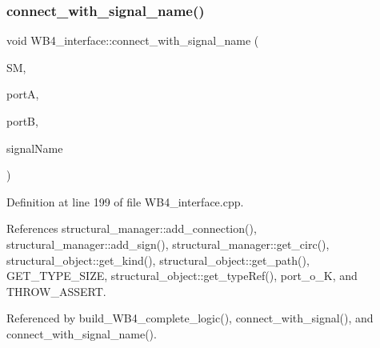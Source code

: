 \subsubsection{\texorpdfstring{connect\+\_\+with\+\_\+signal\+\_\+name()}{connect\_with\_signal\_name()}\hspace{0.1cm}{\footnotesize\ttfamily [1/3]}}
{\footnotesize\ttfamily void W\+B4\+\_\+interface\+::connect\+\_\+with\+\_\+signal\+\_\+name (\begin{DoxyParamCaption}\item[{\hyperlink{structural__manager_8hpp_ab3136f0e785d8535f8d252a7b53db5b5}{structural\+\_\+manager\+Ref}}]{SM,  }\item[{\hyperlink{structural__objects_8hpp_a8ea5f8cc50ab8f4c31e2751074ff60b2}{structural\+\_\+object\+Ref}}]{portA,  }\item[{\hyperlink{structural__objects_8hpp_a8ea5f8cc50ab8f4c31e2751074ff60b2}{structural\+\_\+object\+Ref}}]{portB,  }\item[{std\+::string}]{signal\+Name }\end{DoxyParamCaption})\hspace{0.3cm}{\ttfamily [protected]}}



Definition at line 199 of file W\+B4\+\_\+interface.\+cpp.



References structural\+\_\+manager\+::add\+\_\+connection(), structural\+\_\+manager\+::add\+\_\+sign(), structural\+\_\+manager\+::get\+\_\+circ(), structural\+\_\+object\+::get\+\_\+kind(), structural\+\_\+object\+::get\+\_\+path(), G\+E\+T\+\_\+\+T\+Y\+P\+E\+\_\+\+S\+I\+ZE, structural\+\_\+object\+::get\+\_\+type\+Ref(), port\+\_\+o\+\_\+K, and T\+H\+R\+O\+W\+\_\+\+A\+S\+S\+E\+RT.



Referenced by build\+\_\+\+W\+B4\+\_\+complete\+\_\+logic(), connect\+\_\+with\+\_\+signal(), and connect\+\_\+with\+\_\+signal\+\_\+name().

